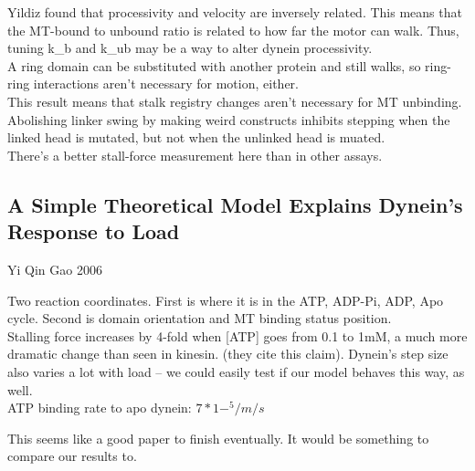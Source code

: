 \documentclass[10pt]{article} %
\begin{document}
Yildiz found that processivity and velocity are inversely related. This means that the MT-bound to unbound ratio is related to how far the motor can walk. Thus, tuning k_b and k_ub may be a way to alter dynein processivity.\\

A ring domain can be substituted with another protein and still walks, so ring-ring interactions aren't necessary for motion, either.\\

This result means that stalk registry changes aren't necessary for MT unbinding.\\

Abolishing linker swing by making weird constructs inhibits stepping when the linked head is mutated, but not when the unlinked head is muated.\\

There's a better stall-force measurement here than in other assays.\\

\subsection{A Simple Theoretical Model Explains Dynein’s Response to Load}
Yi Qin Gao 2006

Two reaction coordinates. First is where it is in the ATP, ADP-Pi, ADP, Apo cycle. Second is domain orientation and MT binding status position.\\

Stalling force increases by 4-fold when [ATP] goes from 0.1 to 1mM, a much more dramatic change than seen in kinesin. (they cite this claim). Dynein's step size also varies a lot with load -- we could easily test if our model behaves this way, as well.\\

ATP binding rate to apo dynein: $7*1-^5/m/s$

This seems like a good paper to finish eventually. It would be something to compare our results to.\\
\end{document}
